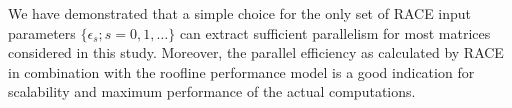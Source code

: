 We have demonstrated that a simple choice for the only set of RACE input parameters $\{\epsilon_s; s=0,1,\ldots\}$ can extract sufficient parallelism for most matrices considered in this study. Moreover, the parallel efficiency as calculated by RACE in combination with the roofline performance model is a good indication for scalability and maximum performance of the actual computations.

